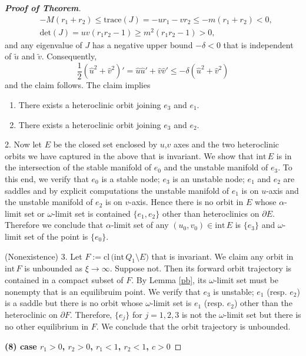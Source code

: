 \documentclass{amsart}
\theoremstyle{definition}
\numberwithin{equation}{section}
\def\ii{{\textrm{int}}\,}
\def\cl{{\textrm{cl}}\,}
\begin{document}
\begin{proof}[\textbf{Proof of Theorem}]
\begin{align*}
&-M(r_1+r_2) \le \textrm{trace}(J) = -ur_1 - vr_2 \le -m(r_1+ r_2) < 0, \\
&\textrm{det}(J) = uv(r_1r_2-1) \ge m^2(r_1r_2-1) >0,
\end{align*}
and any eigenvalue of $J$ has a negative upper bound $-\delta<0$ that is independent of $\tilde u$ and $\tilde v$. Consequently, 
$$ \frac{1}{2} (\hat{u}^2 + \hat{v}^2)' = \hat u \hat u' + \hat v \hat v' \le -\delta (\hat{u}^2 + \hat{v}^2)$$%
and the claim follows. The claim implies
\begin{enumerate}
 \item There exists a heteroclinic orbit joining $e_3$ and $e_1$.
 \item There exists a heteroclinic orbit joining $e_3$ and $e_2$.
\end{enumerate}

2. Now let $E$ be the closed set enclosed by $u$,$v$ axes and the two heteroclinic orbits we have captured in the above that is invariant. We show that $\ii E$ is in the intersection of the stable manifold of $e_0$ and the unstable manifold of $e_3$. To this end, we verify that $e_0$ is a stable node; $e_3$ is an unstable node; $e_1$ and $e_2$ are saddles and by explicit computations the unstable manifold of $e_1$ is on $u$-axis and the unstable manifold of $e_2$ is on $v$-axis. Hence there is no orbit in $E$ whose $\alpha$-limit set or $\omega$-limit set is contained $\{e_1,e_2\}$ other than heteroclinics on $\partial E$. Therefore we conclude that $\alpha$-limit set of any $(u_0,v_0) \in\ii E$ is $\{e_3\}$ and $\omega$-limit set of the point is $\{e_0\}$.

(Nonexistence) 3. Let $F:= \cl\big( \ii Q_1 \setminus E\big)$ that is invariant. We claim any orbit in $\ii F$ is unbounded as $\xi \rightarrow \infty$. Suppose not. Then its forward orbit trajectory is contained in a compact subset of $F$. By Lemma \ref{pb}, its $\omega$-limit set must be nonempty that is an equilibruim point. We verify that $e_3$ is unstable; $e_1$ (resp. $e_2$) is a saddle but there is no orbit whose $\omega$-limit set is $e_1$ (resp. $e_2$) other than the heteroclinic on $\partial F$. Therefore, $\{e_j\}$ for $j=1,2,3$ is not the $\omega$-limit set but there is no other equilibrium in $F$. We conclude that the orbit trajectory is unbounded.

\bigskip

\textbf{(8) \boldmath case  $r_1>0$, $r_2>0$, $r_1<1$, $r_2<1$, $c>0$}


\end{proof}
\end{document}
